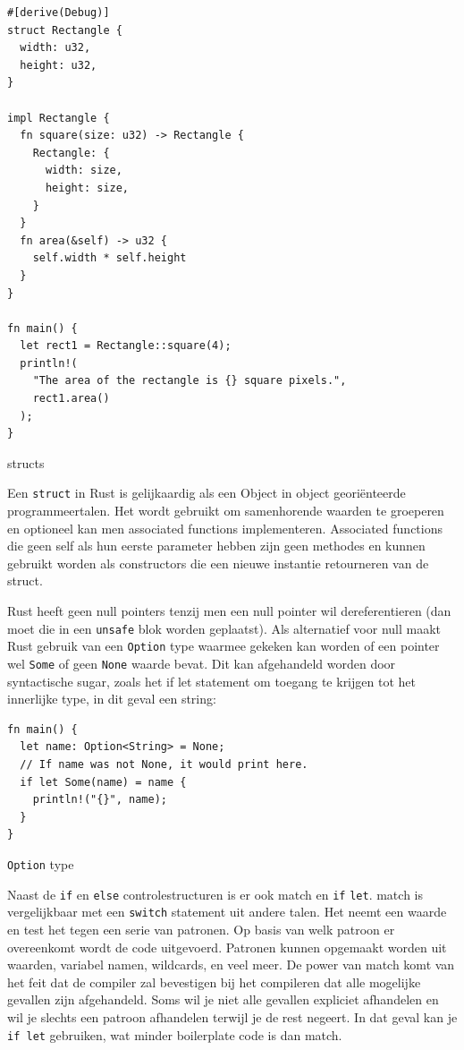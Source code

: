 \begin{listing}[h]
\begin{verbatim}
#[derive(Debug)]
struct Rectangle {
  width: u32,
  height: u32,
}

impl Rectangle {
  fn square(size: u32) -> Rectangle {
    Rectangle: {
      width: size,
      height: size,
    }
  }
  fn area(&self) -> u32 {
    self.width * self.height
  }
}

fn main() {
  let rect1 = Rectangle::square(4);
  println!(
    "The area of the rectangle is {} square pixels.",
    rect1.area()
  );
}

\end{verbatim}
\caption{structs}
\end{listing}

Een \texttt{struct} in Rust is gelijkaardig als een Object in object georiënteerde
programmeertalen. Het wordt gebruikt om samenhorende waarden te groeperen en optioneel kan men
associated functions implementeren. Associated functions die geen self als hun eerste parameter
hebben zijn geen methodes en kunnen gebruikt worden als constructors die een nieuwe instantie
retourneren van de struct.

Rust heeft geen null pointers tenzij men een null pointer wil dereferentieren (dan moet die in een
\texttt{unsafe} blok worden geplaatst). Als alternatief voor null maakt Rust gebruik van
een \texttt{Option} type waarmee gekeken kan worden of een pointer wel
\texttt{Some} of geen \texttt{None} waarde bevat. Dit
kan afgehandeld worden door syntactische sugar, zoals het if let statement om toegang te krijgen tot
het innerlijke type, in dit geval een string:

\begin{listing}[h]
\begin{verbatim}
fn main() {
  let name: Option<String> = None;
  // If name was not None, it would print here.
  if let Some(name) = name {
    println!("{}", name);
  }
}
\end{verbatim}
\caption{\texttt{Option} type}
\end{listing}

Naast de \texttt{if} en \texttt{else} controlestructuren is er ook match en
\texttt{if} \texttt{let}. match is vergelijkbaar met een
\texttt{switch} statement uit andere talen. Het neemt een waarde en test het tegen
een serie van patronen. Op basis van welk patroon er overeenkomt wordt de code uitgevoerd. Patronen
kunnen opgemaakt worden uit waarden, variabel namen, wildcards, en veel meer. De power van match
komt van het feit dat de compiler zal bevestigen bij het compileren dat alle mogelijke gevallen zijn
afgehandeld. Soms wil je niet alle gevallen expliciet afhandelen en wil je slechts een patroon
afhandelen terwijl je de rest negeert. In dat geval kan je \texttt{if let} gebruiken, wat
minder boilerplate code is dan match.

